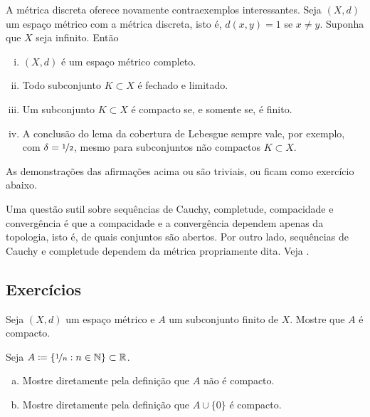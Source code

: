 \begin{example}
A métrica discreta oferece novamente contraexemplos interessantes.
Seja $(X,d)$ um espaço métrico com a métrica discreta, isto é,
$d(x,y) = 1$
se $x \neq y$. Suponha que
$X$ seja infinito. Então
\begin{enumerate}[(i)]
\item $(X,d)$ é um espaço métrico completo.
\item Todo subconjunto $K \subset X$ é fechado e limitado.
\item Um subconjunto $K \subset X$ é compacto se, e somente se, é finito.
\item A conclusão do lema da cobertura de Lebesgue sempre vale,
por exemplo, com $\delta = \nicefrac{1}{2}$,
mesmo para subconjuntos não compactos $K \subset X$.
\end{enumerate}
As demonstrações das afirmações acima ou são triviais, ou ficam como
exercício abaixo.
\end{example}

\begin{remark}
Uma questão sutil sobre sequências de Cauchy, completude, compacidade
e convergência é que a compacidade e a convergência dependem apenas da
topologia, isto é, de quais conjuntos são abertos. Por outro lado,
sequências de Cauchy e completude dependem da métrica propriamente dita.
Veja .
\end{remark}

\subsection{Exercícios}

\begin{exercise}
Seja $(X,d)$ um espaço métrico e $A$ um subconjunto finito de $X$.
Mostre que $A$ é compacto.
\end{exercise}

\begin{samepage}
\begin{exercise}
Seja $A \coloneqq \{ \nicefrac{1}{n} : n \in {\mathbb{N}} \} \subset {\mathbb{R}}$.
\begin{enumerate}[a)]
\item
Mostre diretamente pela definição que $A$ não é compacto.
\item
Mostre diretamente pela definição que $A \cup \{ 0 \}$ é compacto.
\end{enumerate}
\end{exercise}
\end{samepage}

